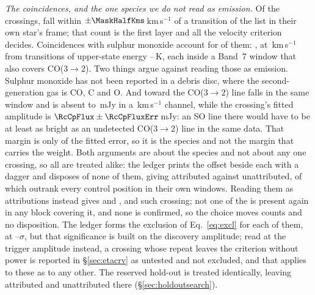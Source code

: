 \begin{table}
\centering
\footnotesize
\caption{The line mask, by species: the number of transitions $N$ it holds,
the frequency range they span inside the searched intervals and their
upper-state energies. Hydrogen recombination lines carry no tabulated
$E_{\rm u}$.}
\label{tab:masklines}

\end{table}

\emph{The coincidences, and the one species we do not read as emission.} Of
the \NCross{} crossings, \MkNCoinc{} fall within
$\pm\MaskHalfKms$\,km\,s$^{-1}$ of a transition of the list in their own
star's frame; that count is the first layer and all the velocity criterion
decides. Coincidences with sulphur monoxide account for \MkNSODecide{} of them:
\MkSOStars, at \MkSODvList\,km\,s$^{-1}$ from transitions of upper-state
energy \MkSOEuLo--\MkSOEuHi\,K, each inside a Band~7 window that also covers
CO($3\to2$). Two things argue against reading those as emission.
Sulphur monoxide has not been reported in a debris disc, where the
second-generation gas is CO, C and O. And toward \FrCpStar{} the CO($3\to2$)
line falls in the same window and is absent to \FrCpCoLimMJy\,mJy in a
\FrCpCoChanKms\,km\,s$^{-1}$ channel, while the crossing's fitted amplitude is
$\RcCpFlux\pm\RcCpFluxErr$\,mJy: an SO line there would have to be at
least as bright as an undetected CO($3\to2$) line in the same data. That
margin is only \RqAmpSigmaCp{} of the fitted error, so it is the species and
not the margin that carries the weight. Both arguments are about the species
and
not about any one crossing, so all \MkNSODecide{} are treated alike:
the ledger prints the offset beside each with a dagger and
disposes of none of them, giving \MkAttr{} attributed against \MkUnattr{}
unattributed, of which \MkRankLeadWord{} outrank every control position in
their own windows.
Reading them as attributions instead gives \MkAttrAlt{} and \MkUnattrAlt,
and \MkRankLeadAlt{} such crossing; not one of the \MkNSODecide{} is present
again in any block covering it, and none is confirmed, so the choice moves
counts and no disposition. The ledger forms the exclusion of
Eq.~\ref{eq:excl} for each of them, at
\MkAttrExclLo--\MkAttrExclHi$\sigma$, but that significance is built on the
discovery amplitude; read at the trigger amplitude instead, a crossing whose
repeat leaves the criterion without power is reported in
\S\ref{sec:etacrv} as untested and not excluded, and that applies to
these as to any other. The reserved hold-out is treated identically, leaving
\HoNAttr{}
attributed and \HoNUnattr{} unattributed there (\S\ref{sec:holdoutsearch}).

